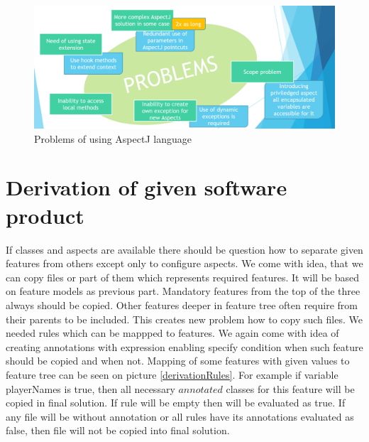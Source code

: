 \documentclass[11pt,english,a4paper,twoside]{article}
\begin{document}
\begin{figure}[t]  %
					\begin{center}
									\includegraphics[width=\linewidth]{fig/problemsOfAspectJEN.png}
									\caption{Problems of using AspectJ language}
									\label{problemsOfAspectJ}
					\end{center}
\end{figure}



\section{Derivation of given software product} \label{gameDerivation}

If classes and aspects are available there should be question how to separate given features from others except only to configure aspects. We come with idea, that we can copy files or part of them which represents required features. It will be based on feature models as previous part. Mandatory features from the top of the three always should be copied. Other features deeper in feature tree often require from their parents to be included. This creates new problem how to copy such files. We needed rules which can be mappped to features. We again come with idea of creating annotations with expression enabling specify condition when such feature should be copied and when not. Mapping of some features with given values to feature tree can be seen on picture \ref{derivationRules}. For example if variable playerNames is true, then all necessary \(annotated\) classes for this feature will be copied in final solution. If rule will be empty then will be evaluated as true. If any file will be without annotation or all rules have its annotations evaluated as false, then file will not be copied into final solution.
\end{document}
